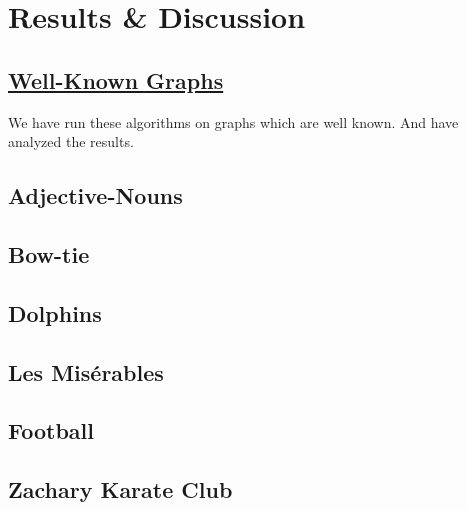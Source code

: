 \documentclass[twocolumn,twoside]{IEEEtran}
\begin{document}
\section*{Results \& Discussion}\label{sec:RD}



%
% 
%
%
%   
\subsection*{\underline{Well-Known Graphs}}

\newcommand{\inputsamepage}[1] {
    \begin{minipage}{\linewidth}
        
    \end{minipage}
}

We have run these algorithms on graphs which are well known. And have analyzed the
results.

\subsection*{Adjective-Nouns}
\inputsamepage{include/adjnoun.tex}

\subsection*{Bow-tie}
\inputsamepage{include/bowtie.tex}

\subsection*{Dolphins}
\inputsamepage{include/dolphins.tex}

\subsection*{Les Mis\'{e}rables}
\inputsamepage{include/lesmis.tex}

\subsection*{Football}
\inputsamepage{include/football.tex}

\subsection*{Zachary Karate Club}
\inputsamepage{include/karate.tex}
\end{document}
